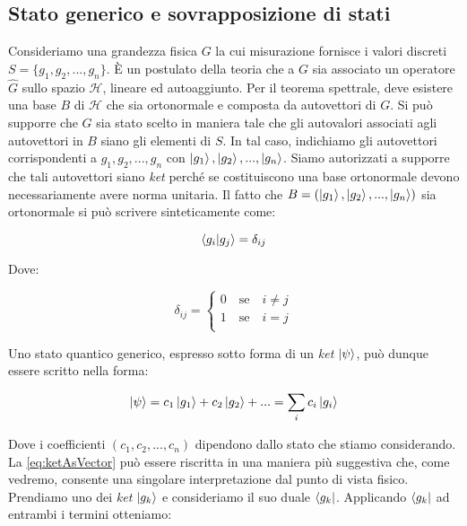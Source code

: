 \subsection{Stato generico e sovrapposizione di stati}

Consideriamo una grandezza fisica $G$ la cui misurazione fornisce i valori discreti $S = \{g_1, g_2, ..., g_n\}$. È un postulato della teoria che a $G$ sia associato un operatore $\hat{G}$ sullo spazio $\mathcal{H}$, lineare ed autoaggiunto. Per il teorema spettrale, deve esistere una base $B$ di $\mathcal{H}$ che sia ortonormale e composta da autovettori di $G$. Si può supporre che $G$ sia stato scelto in maniera tale che gli autovalori associati agli autovettori in $B$ siano gli elementi di $S$.
In tal caso, indichiamo gli autovettori corrispondenti a $g_1, g_2, ..., g_n$ con $\ket{g_1}, \ket{g_2}, ..., \ket{g_n}$. Siamo autorizzati a supporre che tali autovettori siano \textit{ket} perché se costituiscono una base ortonormale devono necessariamente avere norma unitaria.
Il fatto che $B = ( \ket{g_1}, \ket{g_2}, ..., \ket{g_n} ) $ sia ortonormale si può scrivere sinteticamente come: 

	\begin{equation} \label{eq:orthonormalBasis}
		\braket{g_i}{g_j} = \delta_{ij}
	\end{equation}

Dove:

 	\begin{equation}
		\delta_{ij} = \left \{ \begin{array}{l}
				0 \quad \text{se} \quad i \neq j \\
				1 \quad \text{se} \quad i = j \\
			\end{array}
		\right.
	\end{equation}


Uno stato quantico generico, espresso sotto forma di un \textit{ket} $\ket{\psi}$, può dunque essere scritto nella forma:

	\begin{equation} \label{eq:ketAsVector}
		\ket{\psi} = c_1 \ket{g_1} + c_2 \ket{g_2} + ... = \sum_i c_i \ket{g_i}
	\end{equation}

Dove i coefficienti $(c_1, c_2, ..., c_n)$ dipendono dallo stato che stiamo considerando. La \eqref{eq:ketAsVector} può essere riscritta in una maniera più suggestiva che, come vedremo, consente una singolare interpretazione dal punto di vista fisico. Prendiamo uno dei \textit{ket} $\ket{g_k}$ e consideriamo il suo duale $\bra{g_k}$. Applicando $\bra{g_k}$ ad entrambi i termini otteniamo:

